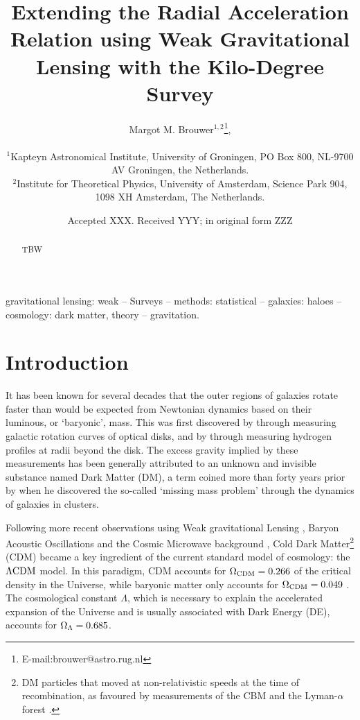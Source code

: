 \documentclass[usenatbib]{mnras}
\title[Extending the RAR with KiDS weak lensing]{Extending the Radial Acceleration Relation using Weak Gravitational Lensing with the Kilo-Degree Survey}
\author[M. M. Brouwer et al.]{Margot M. Brouwer$^{1,2}$\thanks{E-mail:brouwer@astro.rug.nl},
	\\
	\\
	$^{1}$Kapteyn Astronomical Institute, University of Groningen, PO Box 800, NL-9700 AV Groningen, the Netherlands.\\
	$^{2}$Institute for Theoretical Physics, University of Amsterdam, Science Park 904, 1098 XH Amsterdam, The Netherlands. \\
}
\date{Accepted XXX. Received YYY; in original form ZZZ}
\newcommand{\lcdm}{{\rm \Lambda CDM}}
\begin{document}
\label{firstpage}
\pagerange{\pageref{firstpage}--\pageref{lastpage}}
\maketitle

\begin{abstract}
TBW
\end{abstract}


\begin{keywords}
gravitational lensing: weak -- Surveys -- methods: statistical -- galaxies: haloes -- cosmology: dark matter, theory -- gravitation.
\\
\end{keywords}

\clearpage




\section{Introduction}
\label{sec:introduction}

It has been known for several decades that the outer regions of galaxies rotate faster than would be expected from Newtonian dynamics based on their luminous, or `baryonic', mass. This was first discovered by \cite{rubin1983} through measuring galactic rotation curves of optical disks, and by \cite{bosma1981} through measuring hydrogen profiles at radii beyond the disk. The excess gravity implied by these measurements has been generally attributed to an unknown and invisible substance named Dark Matter (DM), a term coined more than forty years prior by \cite{zwicky1937} when he discovered the so-called `missing mass problem' through the dynamics of galaxies in clusters.

Following more recent observations using Weak gravitational Lensing \cite[WL,][]{hoekstra2004,linden2014,mandelbaum2015}, Baryon Acoustic Oscillations \cite[BAO's,][]{eisenstein2005,blake2011} and the Cosmic Microwave background \cite[CMB,][]{spergel2003,planck2014}, Cold Dark Matter\footnote{DM particles that moved at non-relativistic speeds at the time of recombination, as favoured by measurements of the CBM \cite[]{planck2014} and the Lyman-$\alpha$ forest \cite[]{viel2013}.} (CDM) became a key ingredient of the current standard model of cosmology: the $\lcdm$ model. In this paradigm, CDM accounts for $\Omega_{\rm CDM}=0.266$ of the critical density in the Universe, while baryonic matter only accounts for $\Omega_{\rm CDM}=0.049$ \cite[]{planck2018}. The cosmological constant $\Lambda$, which is necessary to explain the accelerated expansion of the Universe and is usually associated with Dark Energy (DE), accounts for $\Omega_{\rm \Lambda}=0.685$.
\end{document}
